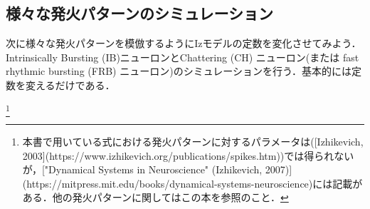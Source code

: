 \subsection{様々な発火パターンのシミュレーション}
次に様々な発火パターンを模倣するようにIzモデルの定数を変化させてみよう．Intrinsically Bursting (IB)ニューロンとChattering (CH) ニューロン(または fast rhythmic bursting (FRB) ニューロン)のシミュレーションを行う．基本的には定数を変えるだけである．

\footnote{
本書で用いている式における発火パターンに対するパラメータは([Izhikevich, 2003](https://www.izhikevich.org/publications/spikes.htm))では得られないが，["Dynamical Systems in Neuroscience" (Izhikevich, 2007)](https://mitpress.mit.edu/books/dynamical-systems-neuroscience)には記載がある．他の発火パターンに関してはこの本を参照のこと．
}
